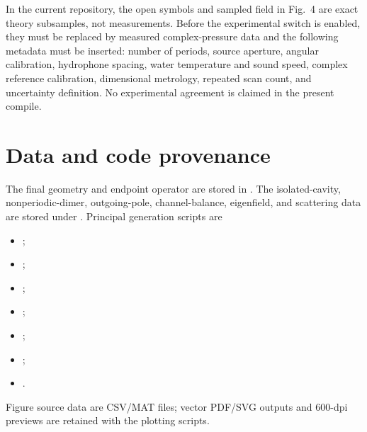 \documentclass[aps,prl,reprint,superscriptaddress,nofootinbib,floatfix]{revtex4-2}
\newif\ifexperimental
\begin{document}
\ifexperimental
The final experimental record must state the number of periods, source
aperture, angular calibration, hydrophone spacing, water temperature and sound
speed, complex reference calibration, sample-dimensional metrology, repeated
scan count, and uncertainty definition.  A flat reflector, a blocked-small-
groove sample, and at least two finite array lengths are required controls.
\else
In the current repository, the open symbols and sampled field in Fig.~4 are
exact theory subsamples, not measurements.  Before the experimental switch is
enabled, they must be replaced by measured complex-pressure data and the
following metadata must be inserted: number of periods, source aperture,
angular calibration, hydrophone spacing, water temperature and sound speed,
complex reference calibration, dimensional metrology, repeated scan count,
and uncertainty definition.  No experimental agreement is claimed in the
present compile.
\fi

\section{Data and code provenance}

The final geometry and endpoint operator are stored in
.
The isolated-cavity, nonperiodic-dimer, outgoing-pole, channel-balance, eigenfield,
and scattering data are stored under
.  Principal generation scripts are
\begin{itemize}
\item {};
\item {};
\item {};
\item {};
\item {};
\item {};
\item {}.
\end{itemize}
Figure source data are CSV/MAT files; vector PDF/SVG outputs and 600-dpi
previews are retained with the plotting scripts.
\end{document}
